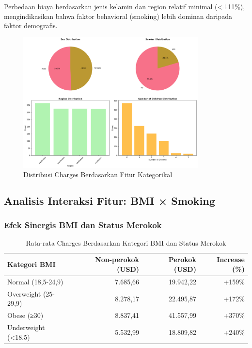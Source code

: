 Perbedaan biaya berdasarkan jenis kelamin dan region relatif minimal (<±11\%), mengindikasikan bahwa faktor behavioral (smoking) lebih dominan daripada faktor demografis.

\begin{figure}[H]
\centering
\includegraphics[width=0.85\textwidth]{../results/plots/02_categorical_features.png}
\caption{Distribusi Charges Berdasarkan Fitur Kategorikal}
\label{fig:categorical-features}
\end{figure}

\subsection{Analisis Interaksi Fitur: BMI × Smoking}
\label{subsec:interaksi-fitur}

\subsubsection{Efek Sinergis BMI dan Status Merokok}

\begin{table}[H]
\centering
\caption{Rata-rata Charges Berdasarkan Kategori BMI dan Status Merokok}
\label{tab:bmi-smoking-interaction}
\begin{tabular}{|l|r|r|r|}
\hline
\textbf{Kategori BMI} & \textbf{Non-perokok (USD)} & \textbf{Perokok (USD)} & \textbf{Increase (\%)} \\
\hline
Normal (18,5-24,9) & 7.685,66 & 19.942,22 & +159\% \\
Overweight (25-29,9) & 8.278,17 & 22.495,87 & +172\% \\
Obese (≥30) & 8.837,41 & 41.557,99 & +370\% \\
Underweight (<18,5) & 5.532,99 & 18.809,82 & +240\% \\
\hline
\end{tabular}
\end{table}

